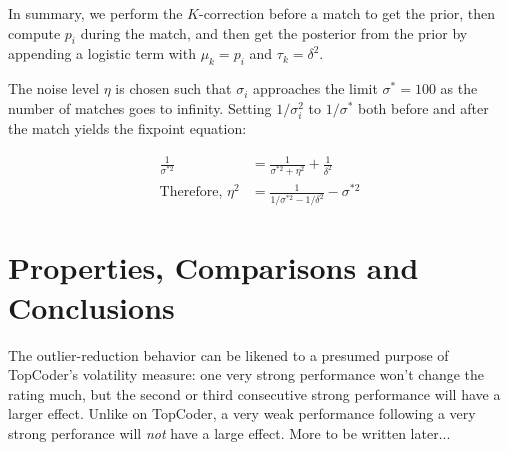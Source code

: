 \documentclass{article}
\begin{document}
In summary, we perform the $K$-correction before a match to get the prior, then compute $p_i$ during the match, and then get the posterior from the prior by appending a logistic term with $\mu_k = p_i$ and $\tau_k = \delta^2$.

The noise level $\eta$ is chosen such that $\sigma_i$ approaches the limit $\sigma^* = 100$ as the number of matches goes to infinity. Setting $1/\sigma_i^2$ to $1/\sigma^*$ both before and after the match yields the fixpoint equation:

\begin{align}
\frac{1}{\sigma^{*2}} &= \frac{1}{\sigma^{*2} + \eta^2} + \frac{1}{\delta^2}
\\ \text{Therefore, }\eta^2 &= \frac{1}{1/\sigma^{*2} - 1/\delta^2} - \sigma^{*2}
\end{align}

\section{Properties, Comparisons and Conclusions}

The outlier-reduction behavior can be likened to a presumed purpose of TopCoder's volatility measure: one very strong performance won't change the rating much, but the second or third consecutive strong performance will have a larger effect. Unlike on TopCoder, a very weak performance following a very strong perforance will \emph{not} have a large effect. More to be written later...
\end{document}
